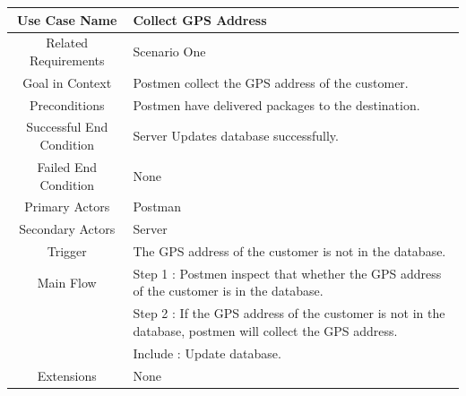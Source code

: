 \documentclass[12pt]{scrreprt}
\begin{document}
\begin{table}[H]
  \centering
  \begin{tabular}{| c | p{11cm} |}
    \hline
    Use Case Name & Collect GPS Address\\
    \hline
    Related Requirements & Scenario One\\
    \hline
    Goal in Context & Postmen collect the GPS address of the customer.\\
    \hline
    Preconditions & Postmen have delivered packages to the destination.\\
    \hline
    Successful End Condition & Server Updates database successfully.\\
    \hline
    Failed End Condition & None\\
    \hline
    Primary Actors & Postman\\
    \hline
    Secondary Actors & Server\\
    \hline
    Trigger & The GPS address of  the customer is not in the database.\\
    \hline
    Main Flow & Step 1 : Postmen inspect that whether the GPS address of
    the customer is in the database.\\
    & Step 2 : If the GPS address of  the customer is not in the database,
    postmen will collect the GPS address.\\
    & Include : Update database.\\
    \hline
    Extensions & None\\
    \hline
  \end{tabular}
\end{table}
\end{document}
